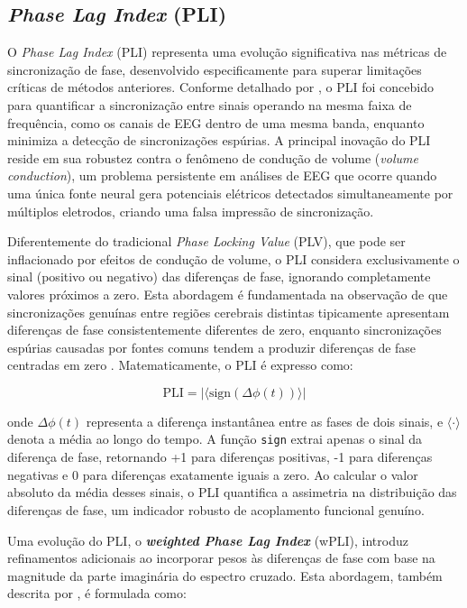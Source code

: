 \subsection{\textit{Phase Lag Index} (PLI)}
O \textit{Phase Lag Index} (PLI) representa uma evolução significativa nas métricas de sincronização de fase, desenvolvido especificamente para superar limitações críticas de métodos anteriores. Conforme detalhado por , o PLI foi concebido para quantificar a sincronização entre sinais operando na mesma faixa de frequência, como os canais de EEG dentro de uma mesma banda, enquanto minimiza a detecção de sincronizações espúrias. A principal inovação do PLI reside em sua robustez contra o fenômeno de condução de volume (\textit{volume conduction}), um problema persistente em análises de EEG que ocorre quando uma única fonte neural gera potenciais elétricos detectados simultaneamente por múltiplos eletrodos, criando uma falsa impressão de sincronização.

Diferentemente do tradicional \textit{Phase Locking Value} (PLV), que pode ser inflacionado por efeitos de condução de volume, o PLI considera exclusivamente o sinal (positivo ou negativo) das diferenças de fase, ignorando completamente valores próximos a zero. Esta abordagem é fundamentada na observação de que sincronizações genuínas entre regiões cerebrais distintas tipicamente apresentam diferenças de fase consistentemente diferentes de zero, enquanto sincronizações espúrias causadas por fontes comuns tendem a produzir diferenças de fase centradas em zero \cite{seraj2018cerebral}. Matematicamente, o PLI é expresso como:

\[
\text{PLI} = |\langle \text{sign}(\Delta\phi(t)) \rangle|
\]

onde \(\Delta\phi(t)\) representa a diferença instantânea entre as fases de dois sinais, e \(\langle \cdot \rangle\) denota a média ao longo do tempo. A função \texttt{sign} extrai apenas o sinal da diferença de fase, retornando +1 para diferenças positivas, -1 para diferenças negativas e 0 para diferenças exatamente iguais a zero. Ao calcular o valor absoluto da média desses sinais, o PLI quantifica a assimetria na distribuição das diferenças de fase, um indicador robusto de acoplamento funcional genuíno.

Uma evolução do PLI, o \textit{\textbf{weighted Phase Lag Index}} (wPLI), introduz refinamentos adicionais ao incorporar pesos às diferenças de fase com base na magnitude da parte imaginária do espectro cruzado. Esta abordagem, também descrita por , é formulada como:


